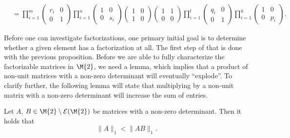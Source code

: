 \begin{remark*}
\begin{align*}
&= \prod_{i=1}^m \begin{pmatrix} r_i & 0 \\ 0 & 1 \end{pmatrix} \prod_{i=1}^n \begin{pmatrix} 1 & 0 \\ 0 & s_i \end{pmatrix} \begin{pmatrix} 1 & 0 \\ 1 & 0 \end{pmatrix} \begin{pmatrix} 1 & 1 \\ 0 & 0 \end{pmatrix}\prod_{i=1}^l \begin{pmatrix} q_i & 0 \\ 0 & 1 \end{pmatrix}\prod_{i=1}^k \begin{pmatrix} 1 & 0 \\ 0 & p_i \end{pmatrix}.
\end{align*}
\end{remark*}

Before one can investigate factorizations, one primary initial goal is to determine whether a given element has a factorization at all. The first step of that is done with the previous proposition. Before we are able to fully characterize the factorizable matrices in $\M{2}$, we need a lemma, which implies that a product of non-unit matrices with a non-zero determinant will eventually ``explode''. To clarify further, the following lemma will state that multiplying by a non-unit matrix with a non-zero determinant will increase the sum of entries.

\begin{lemma}\label{lemma:increasing-sum-of-entries}
Let $A$, $B \in \M{2}\setminus\mathcal{E}(\M{2})$ be matrices with a non-zero determinant. Then it holds that
\[ \| A \|_1 < \| AB \|_1. \] 
\end{lemma}

